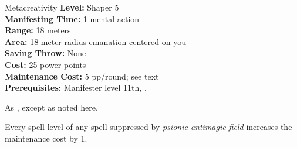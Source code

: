 {Metacreativity}
{
	\textbf{Level:}
	Shaper 5\\
	\textbf{Manifesting Time:}
	1 mental action\\
	\textbf{Range:}
	18 meters\\
	\textbf{Area:}
	18-meter-radius emanation centered on you\\
	\textbf{Saving Throw:}
	None\\
	\textbf{Cost:}
	25 power points\\
	\textbf{Maintenance Cost:}
	5 pp/round; see text\\
	\textbf{Prerequisites:}
	Manifester level 11th, , \\
}
{
	As , except as noted here.

	Every spell level of any spell suppressed by \emph{psionic antimagic field} increases the maintenance cost by 1.
}
